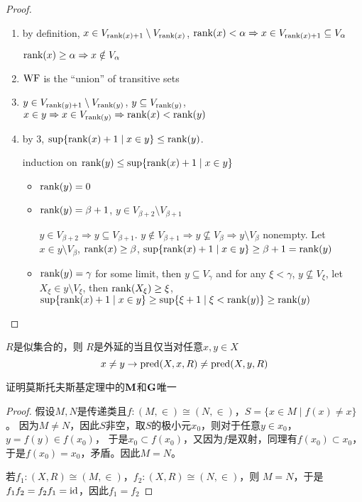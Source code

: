 \documentclass[11pt]{article}
\begin{document}
\begin{proof}
\begin{enumerate}
\item by definition, \(x\in V_{\text{rank}(x)+1}\setminus V_{\text{rank}(x)}\), \(\text{rank}(x)<\alpha\Rightarrow x\in V_{\text{rank}(x)+1}\subseteq V_\alpha\)

\(\text{rank}(x)\ge\alpha\Rightarrow x\notin V_\alpha\)

\item \(\operatorname{WF}\) is the ``union'' of transitive sets

\item \(y\in V_{\text{rank}(y)+1}\setminus V_{\text{rank}(y)}\), \(y\subseteq V_{\text{rank}(y)}\), \(x\in y\Rightarrow x\in V_{\text{rank}(y)}\Rightarrow\text{rank}(x)<\text{rank}(y)\)

\item by 3, \(\sup\{\text{rank}(x)+1\mid x\in y\}\le\text{rank}(y)\).

induction on \(\text{rank}(y)\le\sup\{\text{rank}(x)+1\mid x\in y\}\)
\begin{itemize}
\item \(\text{rank}(y)=0\)
\item \(\text{rank}(y)=\beta+1\), \(y\in V_{\beta+2}\setminus V_{\beta+1}\)

\(y\in V_{\beta+2}\Rightarrow y\subseteq V_{\beta+1}\). \(y\notin V_{\beta+1}\Rightarrow y\not\subseteq V_{\beta}\Rightarrow y\setminus V_\beta\) nonempty.
Let \(x\in y\setminus V_\beta\), \(\text{rank}(x)\ge\beta\), \(\sup\{\text{rank}(x)+1\mid x\in y\}\ge\beta+1=\text{rank}(y)\)
\item \(\text{rank}(y)=\gamma\) for some limit, then \(y\subseteq V_\gamma\) and for any \(\xi<\gamma\), \(y\not\subseteq V_\xi\),
let \(X_\xi\in y\setminus V_\xi\), then \(\text{rank}(X_\xi)\ge\xi\), \(\sup\{\text{rank}(x)+1\mid x\in y\}\ge\sup\{\xi+1\mid\xi<\text{rank}(y)\}\ge\text{rank}(y)\)
\end{itemize}
\end{enumerate}
\end{proof}

\begin{exercise}
\(R\)是似集合的，则
\(R\)是外延的当且仅当对任意\(x,y\in X\)
\begin{equation*}
x\neq y\to\text{pred}(X,x,R)\neq\text{pred}(X,y,R)
\end{equation*}
\end{exercise}

\begin{exercise}[7.10.7]
证明莫斯托夫斯基定理中的\(\operatorname{\textbf{M}}\)和\(\operatorname{\textbf{G}}\)唯一
\end{exercise}

\begin{proof}
假设\(M,N\)是传递类且\(f:(M,\in)\cong(N,\in)\)，\(S=\{x\in M\mid f(x)\neq x\}\)。
因为\(M\neq N\)，因此\(S\)非空，取\(S\)的极小元\(x_0\)，则对于任意\(y\in x_0\)，\(y=f(y)\in f(x_0)\)，
于是\(x_0\subset f(x_0)\)，又因为\(f\)是双射，同理有\(f(x_0)\subset x_0\)，于是\(f(x_0)=x_0\)，矛盾。因此\(M=N\)。

若\(f_1:(X,R)\cong(M,\in)\)，\(f_2:(X,R)\cong(N,\in)\)，则 \(M=N\)，于是\(f_1f_2=f_2f_1=\operatorname{id}\)，因此\(f_1=f_2\)
\end{proof}
\end{document}
